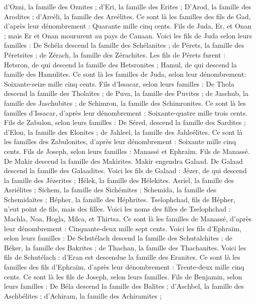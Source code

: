 \begin{multicols}{2}
d'Ozni, la famille des Oznites ; d'Eri, la famille des Erites ;
D'Arod, la famille des Arodites ; d'Areéli, la famille des Areélites.
Ce sont là les familles des fils de Gad, d'après leur dénombrement : Quarante mille cinq cents.
Fils de Juda, Er, et Onan ; mais Er et Onan moururent au pays de Canaan.
Voici les fils de Juda selon leurs familles : De Schéla descend la famille des Schélanites ; de Pérets, la famille des Péretsites ; de Zérach, la famille des Zérachites.
Les fils de Pérets furent : Hetsron, de qui descend la famille des Hetsronites ; Hamul, de qui descend la famille des Hamulites.
Ce sont là les familles de Juda, selon leur dénombrement: Soixante-seize mille cinq cents.
Fils d'Issacar, selon leurs familles : De Thola descend la famille des Tholaïtes ; de Puva, la famille des Puvites ;
de Jaschub, la famille des Jaschubites ; de Schimron, la famille des Schimronites.
Ce sont là les familles d'Issacar, d'après leur dénombrement : Soixante-quatre mille trois cents.
Fils de Zabulon, selon leurs familles : De Séred, descend la famille des Sardites ; d'Elon, la famille des Elonites ; de Jahleel, la famille des Jahleélites.
Ce sont là les familles des Zabulonites, d'après leur dénombrement : Soixante mille cinq cents.
Fils de Joseph, selon leurs familles : Manassé et Ephraïm.
Fils de Manassé. De Makir descend la famille des Makirites. Makir engendra Galaad. De Galaad descend la famille des Galaadites.
Voici les fils de Galaad : Jézer, de qui descend la famille des Jézerites ; Hélek, la famille des Hélekites.
Asriel, la famille des Asriélites ; Sichem, la famille des Sichémites ;
Schemida, la famille des Schemidaïtes ; Hépher, la famille des Héphrites.
Tselophchad, fils de Hépher, n'eut point de fils, mais des filles. Voici les noms des filles de Tselophchad : Machla, Noa, Hogla, Milca, et Thirtsa.
Ce sont là les familles de Manassé, d'après leur dénombrement : Cinquante-deux mille sept cents.
Voici les fils d'Ephraïm, selon leurs familles : De Schutélach descend la famille des Schutalchites ; de Béker, la famille des Bakrites ; de Thachan, la famille des Thachanites.
Voici les fils de Schutélach : d'Eran est descendue la famille des Eranites.
Ce sont là les familles des fils d'Ephraïm, d'après leur dénombrement : Trente-deux mille cinq cents. Ce sont là les fils de Joseph, selon leurs familles.
Fils de Benjamin, selon leurs familles : De Béla descend la famille des Balites ; d'Aschbel, la famille des Aschbélites ; d'Achiram, la famille des Achiramites ;

\end{multicols}
